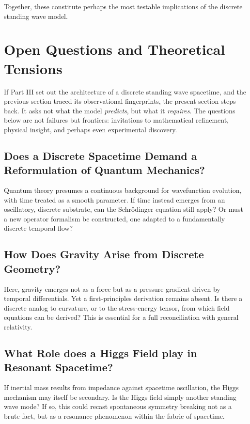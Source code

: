\documentclass[12pt]{article}
\begin{document}
Together, these constitute perhaps the most testable implications of the discrete standing wave model.

\section{Open Questions and Theoretical Tensions}

If Part III set out the architecture of a discrete standing wave spacetime, and the previous section traced its observational fingerprints, the present section steps back. It asks not what the model \emph{predicts}, but what it \emph{requires}. The questions below are not failures but frontiers: invitations to mathematical refinement, physical insight, and perhaps even experimental discovery.

\subsection{Does a Discrete Spacetime Demand a Reformulation of Quantum Mechanics?}

Quantum theory presumes a continuous background for wavefunction evolution, with time treated as a smooth parameter. If time instead emerges from an oscillatory, discrete substrate, can the Schrödinger equation still apply? Or must a new operator formalism be constructed, one adapted to a fundamentally discrete temporal flow?

\subsection{How Does Gravity Arise from Discrete Geometry?}

Here, gravity emerges not as a force but as a pressure gradient driven by temporal differentials. Yet a first-principles derivation remains absent. Is there a discrete analog to curvature, or to the stress-energy tensor, from which field equations can be derived? This is essential for a full reconciliation with general relativity.

\subsection{What Role does a Higgs Field play in Resonant Spacetime?}

If inertial mass results from impedance against spacetime oscillation, the Higgs mechanism may itself be secondary. Is the Higgs field simply another standing wave mode? If so, this could recast spontaneous symmetry breaking not as a brute fact, but as a resonance phenomenon within the fabric of spacetime.
\end{document}
